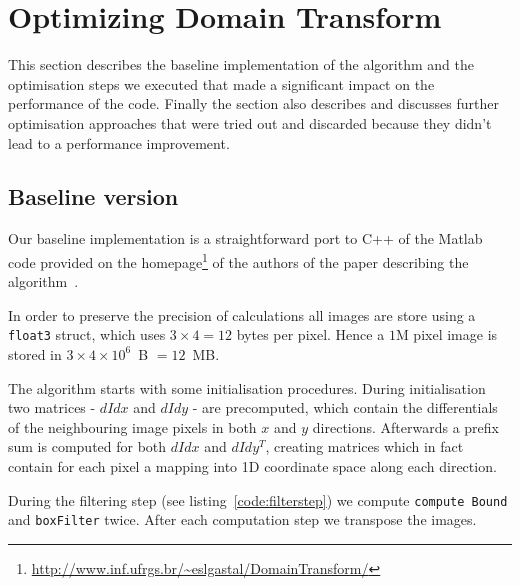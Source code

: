 \section{Optimizing Domain Transform}

This section describes the baseline implementation of the algorithm and the optimisation steps we executed that made a significant impact on the performance of the code. Finally the section also describes and discusses further optimisation approaches that were tried out and discarded because they didn't lead to a performance improvement.

\subsection{Baseline version}

Our baseline implementation is a straightforward port to C++ of the Matlab code provided on the homepage\footnote{\url{http://www.inf.ufrgs.br/~eslgastal/DomainTransform/}} of the authors of the paper describing the algorithm~\cite{GastalOliveira2011DomainTransform}.


In order to preserve the precision of calculations all images are store using a \lstinline{float3} struct, which uses $3\times 4 = 12$ bytes per pixel. Hence a $1$M pixel image is stored in $3\times 4\times 10^6$\ B $=12$\ MB.

The algorithm starts with some initialisation procedures. During initialisation two matrices - $dIdx$ and $dIdy$ - are precomputed, which contain the differentials of the neighbouring image pixels in both $x$ and $y$ directions. Afterwards a prefix sum is computed for both $dIdx$ and $dIdy^T$, creating matrices which in fact contain for each pixel a mapping into 1D coordinate space along each direction.

During the filtering step (see listing~\ref{code:filterstep}) we compute \texttt{comp\-ute\ Bound} and \texttt{boxFilter} twice. After each computation step we transpose the images.

